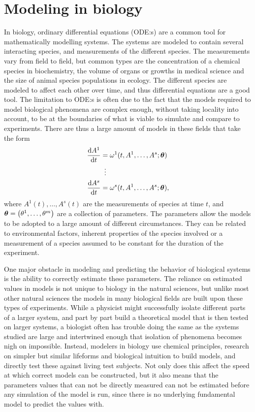 \chapter{Modeling in biology} \label{ch:models}

In biology, ordinary differential equations (ODE:s) are a common tool for mathematically modelling systems.
The systems are modeled to contain several interacting species, and measurements of the different species.
The measurements vary from field to field, but common types are the concentration of a chemical species in biochemistry, the volume of organs or growths in medical science and the size of animal species populations in ecology.
The different species are modeled to affect each other over time, and thus differential equations are a good tool.
The limitation to ODE:s is often due to the fact that the models required to model biological phenomena are complex enough, without taking locality into account, to be at the boundaries of what is viable to simulate and compare to experiments.
There are thus a large amount of models in these fields that take the form
\begin{align*}
  \begin{split} %
    \diff{A^1}{t} &= \omega^1(t, A^1, \dots, A^s; \vb*{\theta}) \\
    &\equalsvdots \\
    \diff{A^s}{t} &= \omega^s(t, A^1, \dots, A^s; \vb*{\theta}),
  \end{split}
\end{align*}
where \(A^1(t), \dots, A^s(t)\) are the measurements of species at time \(t\), and \(\vb*{\theta} = \left(\theta^1, \dots, \theta^m\right)\) are a collection of parameters.
The parameters allow the models to be adopted to a large amount of different circumstances.
They can be related to environmental factors, inherent properties of the species involved or a measurement of a species assumed to be constant for the duration of the experiment.

One major obstacle in modeling and predicting the behavior of biological systems is the ability to correctly estimate these parameters.
The reliance on estimated values in models is not unique to biology in the natural sciences, but unlike most other natural sciences the models in many biological fields are built upon these types of experiments.
While a physicist might successfully isolate different parts of a larger system, and part by part build a theoretical model that is then tested on larger systems, a biologist often has trouble doing the same as the systems studied are large and intertwined enough that isolation of phenomena becomes nigh on impossible.
Instead, modelers in biology use chemical principles, research on simpler but similar lifeforms and biological intuition to build models, and directly test these against living test subjects.
Not only does this affect the speed at which correct models can be constructed, but it also means that the parameters values that can not be directly measured can not be estimated before any simulation of the model is run, since there is no underlying fundamental model to predict the values with.

